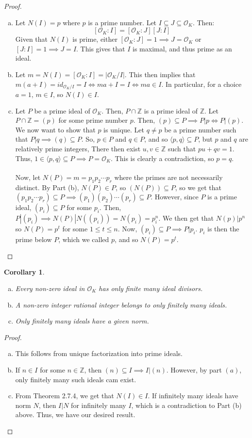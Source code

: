 \documentclass{article}
\newcommand{\air}{\mathcal{O}_K}
\newcommand{\Z}{\mathbb{Z}}
\newtheorem{cor}{Corollary}[subsection]
\begin{document}
\begin{proof}
\begin{enumerate}[a)]
\item Let $N(I)=p$ where $p$ is a prime number. Let $I\subseteq J\subseteq\air$. Then:
$$[\air:I]=[\air:J][J:I]$$
Given that $N(I)$ is prime, either $[\air:J]=1\implies J=\air$ or $[J:I]=1\implies J=I$. This gives that $I$ is maximal, and thus prime as an ideal.
\item Let $m=N(I)=[\air : I]=|\air/I|$. This then implies that $m(a+I)=id_{\air/I}=I\iff ma+I=I\iff ma\in I$. In particular, for a choice $a=1$, $m\in I$, so $N(I)\in I$.
\item Let $P$ be a prime ideal of $\air$. Then, $P\cap\Z$ is a prime ideal of $\Z$. Let $P\cap\Z = (p)$ for some prime number $p$. Then, $(p)\subseteq P\implies P|p\iff P|(p)$. We now want to show that $p$ is unique. Let $q\neq p$ be a prime number such that $P|q\implies (q)\subseteq P$. So, $p\in P$ and $q\in P$, and so $\langle p,q\rangle\subseteq P$, but $p$ and $q$ are relatively prime integers, There then exist $u,v\in\Z$ such that $pu+qv=1$. Thus, $1\in \langle p,q\rangle\subseteq P\implies P=\air$. This is clearly a contradiction, so $p=q$.\\
\\
Now, let $N(P)=m=p_1p_2\cdots p_r$ where the primes are not necessarily distinct. By Part (b), $N(P)\in P$, so $(N(P))\subseteq P$, so we get that $(p_1p_2\cdots p_r)\subseteq P\implies (p_1)(p_2)\cdots (p_r)\subseteq P$. However, since $P$ is a prime ideal, $(p_i)\subseteq P$ for some $p_i$. Then, $P|(p_i)\implies N(P)|N((p_i))=N(p_i)=p_i^n$. We then get that $N(p)|p^n$ so $N(P)=p^t$ for some $1\leq t\leq n$. Now, $(p_i)\subseteq P\implies P|p_i$. $p_i$ is then the prime below $P$, which we called $p$, and so $N(P)=p^t$.
\end{enumerate}
\end{proof}
\begin{cor}
\begin{enumerate}[a)]
\item Every non-zero ideal in $\air$ has only finite many ideal divisors.
\item A non-zero integer rational integer belongs to only finitely many ideals.
\item Only finitely many ideals have a given norm.
\end{enumerate}
\end{cor}
\begin{proof}
\begin{enumerate}[a)]
    \item This follows from unique factorization into prime ideals.
    \item If $n\in I$ for some $n\in\Z$, then $(n)\subseteq I\implies I|(n)$. However, by part $(a)$, only finitely many such ideals cam exist.
    \item From Theorem 2.7.4, we get that $N(I)\in I$. If infinitely many ideals have norm $N$, then $I|N$ for infinitely many $I$, which is a contradiction to Part (b) above. Thus, we have our desired result.
\end{enumerate}
\end{proof}
\end{document}
